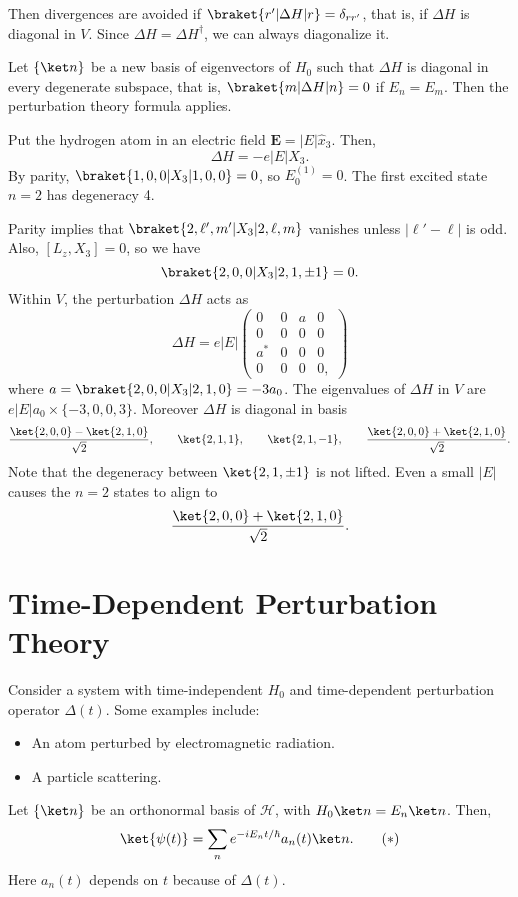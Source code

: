 \documentclass[12pt]{article}
\begin{document}
Then divergences are avoided if $\braket{r'|\Delta H|r} = \delta_{r r'}$, that is, if $\Delta H$ is diagonal in $V$. Since $\Delta H = \Delta H^{\dagger}$, we can always diagonalize it.

Let $\{\ket n\}$ be a new basis of eigenvectors of $H_0$ such that $\Delta H$ is diagonal in every degenerate subspace, that is, $\braket{m|\Delta H|n} = 0$ if $E_n = E_m$. Then the perturbation theory formula applies.

\begin{exbox}
	Put the hydrogen atom in an electric field $\mathbf{E} = |E| \hat x_3$. Then,
	\[
	\Delta H = - e | E| X_3.
	\]
	By parity, $\braket{1, 0, 0|X_3|1, 0, 0} = 0$, so $E_0^{(1)} = 0$. The first excited state $n = 2$ has degeneracy 4.

	Parity implies that $\braket{2, \ell', m' | X_3| 2, \ell, m}$ vanishes unless $|\ell'-\ell|$ is odd. Also, $[L_z, X_3] = 0$, so we have
	\[
		\braket{2, 0, 0 | X_3 | 2, 1, \pm 1} = 0.
	\]
	Within $V$, the perturbation $\Delta H$ acts as
	\[
	\Delta H = e |E|
	\begin{pmatrix}
		0&0&a&0 \\
		0&0&0&0 \\
		a^{\ast}&0&0&0\\
		0&0&0&0,
	\end{pmatrix}
	\]
	where $a = \braket{2, 0, 0|X_3|2, 1, 0} = -3 a_0$. The eigenvalues of $\Delta H$ in $V$ are $e |E| a_0 \times \{-3, 0, 0, 3\}$. Moreover $\Delta H$ is diagonal in basis
	\[
		\frac{\ket{2, 0, 0} - \ket{2, 1, 0}}{\sqrt 2}, \qquad \ket{2, 1, 1}, \qquad \ket{2, 1, -1}, \qquad \frac{\ket{2, 0, 0} + \ket{2, 1, 0}}{\sqrt 2}.
	\]
	Note that the degeneracy between $\ket{2, 1, \pm 1}$ is not lifted. Even a small $|E|$ causes the $n = 2$ states to align to
	\[
		\frac{\ket{2, 0, 0} + \ket{2, 1, 0}}{\sqrt 2}.
	\]
\end{exbox}


\newpage

\section{Time-Dependent Perturbation Theory}
\label{sec:time_pt}

Consider a system with time-independent $H_0$ and time-dependent perturbation operator $\Delta (t)$. Some examples include:
\begin{itemize}
	\item An atom perturbed by electromagnetic radiation.
	\item A particle scattering.
\end{itemize}
Let $\{\ket n\}$ be an orthonormal basis of $\mathcal{H}$, with $H_0 \ket n = E_n \ket n$. Then,
\[
	\ket{\psi(t)} = \sum_n e^{-i E_n t/\hbar} a_n(t) \ket n. \tag{$\ast$}
\]
Here $a_n(t)$ depends on $t$ because of $\Delta(t)$.
\end{document}
